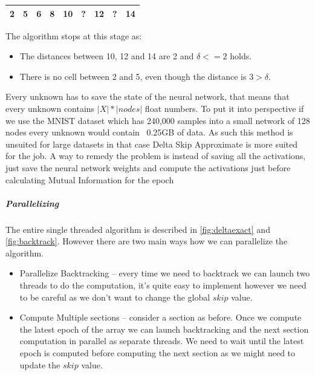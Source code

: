   \begin{table}[H]
    \centering
      \begin{tabular}{|c|c|c|c|c|c|c|c|c|}
      \hline			
        2&\bf{5}&6&\bf{8}&10&?&12&?&14\\
      \hline  
    \end{tabular}
  \end{table}

  The algorithm stops at this stage as:
  \begin{itemize}
    \item{
        The distances between 10, 12 and 14 are 2 and $\delta <= 2$ holds.
      }
    \item{
        There is no cell between 2 and 5, even though the distance is $3 >
        \delta$.
      }
  \end{itemize}

  Every unknown has to save the state of the neural network, that means that
  every unknown contains $|X|*|nodes|$ float numbers. To put it into perspective
  if we use the MNIST dataset which has 240,000 samples into a small network of
  128 nodes every unknown would contain ~0.25GB of data. As such this method is
  unsuited for large datasets in that case Delta Skip Approximate is more suited
  for the job. A way to remedy the problem is instead of saving all the
  activations, just save the neural network weights and compute the activations
  just before calculating Mutual Information for the epoch
  
  \subparagraph{Parallelizing} 
  The entire single threaded algorithm is described in \autoref{fig:deltaexact}
  and \autoref{fig:backtrack}. However there are two main ways how we can
  parallelize the algorithm.
  \begin{itemize}
    \item{
        Parallelize Backtracking -- every time we need to backtrack we can
        launch two threads to do the computation, it's quite easy to implement
        however we need to be careful as we don't want to change the global
        $skip$ value.
      }
    \item{
        Compute Multiple sections -- consider a section as before.
        Once we compute the latest epoch of the array we can launch backtracking
        and the next section computation in parallel as separate threads.
        We need to wait until the latest epoch is computed before computing the
        next section as we might need to
        update the $skip$ value.
      }
  \end{itemize}

